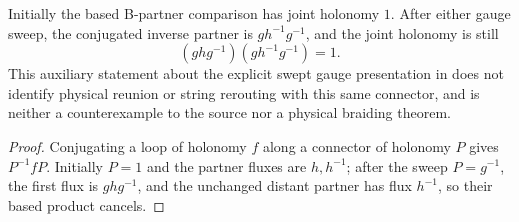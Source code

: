 \begin{lemma}
    \label{thm:peps_torus_swept_patch_B_joint_holonomy}
    \leanok
    Initially the based B-partner comparison has joint holonomy $1$.
    After either gauge sweep, the conjugated inverse partner is
    $g h^{-1}g^{-1}$, and the joint holonomy is still
    \[
        (g h g^{-1})(g h^{-1}g^{-1})=1.
    \]
    This auxiliary statement about the explicit swept gauge presentation
    in \cite[fluxon-braiding passage]{Schuch2010PEPS} does not identify
    physical reunion or string rerouting with this same connector, and is
    neither a counterexample to the source nor a physical braiding theorem.
\end{lemma}
\begin{proof}\leanok
    Conjugating a loop of holonomy $f$ along a connector of holonomy $P$
    gives $P^{-1}fP$. Initially $P=1$ and the partner fluxes are $h,h^{-1}$;
    after the sweep $P=g^{-1}$, the first flux is $ghg^{-1}$, and the unchanged
    distant partner has flux $h^{-1}$, so their based product cancels.
\end{proof}
